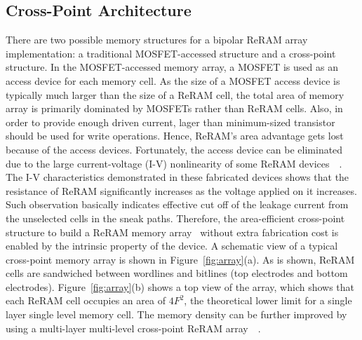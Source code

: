 \subsection{Cross-Point Architecture}
There are two possible memory structures for a bipolar ReRAM array
implementation: a traditional MOSFET-accessed structure and a cross-point
structure. In the MOSFET-accessed memory array, a MOSFET is used as an
access device for each memory cell. As the size of a MOSFET access device
is typically much larger than the size of a ReRAM cell, the total area of
memory array is primarily dominated by MOSFETs rather than ReRAM cells.
Also, in order to provide enough driven current, lager than minimum-sized
transistor should be used for write operations. Hence, ReRAM's area
advantage gets lost because of the access devices.
Fortunately, the access device can be eliminated due to the large current-voltage (I-V)
nonlinearity of some ReRAM devices~~\cite{memristor:switch,memristor:Unity}. The I-V characteristics demonstrated in these fabricated devices shows that the resistance of ReRAM significantly increases as the voltage applied on it increases. Such observation basically indicates effective cut off of the leakage current from the unselected cells in the sneak paths. Therefore, the area-efficient cross-point structure to build a ReRAM memory array~\cite{memristor:Cong} without extra fabrication cost is enabled by the intrinsic property of the device. A schematic view of a typical
cross-point memory array is shown in Figure~\ref{fig:array}(a). As is
shown, ReRAM cells are sandwiched between wordlines and bitlines (top
electrodes and bottom electrodes). Figure~\ref{fig:array}(b) shows a top
view of the array, which shows that each ReRAM cell occupies an area of
$4F^2$, the theoretical lower limit for a single layer single level memory
cell. The memory density can be further improved by using a multi-layer
multi-level cross-point ReRAM
array~\cite{crossbar_unity}~\cite{memristor:IEDM08_3D}.

